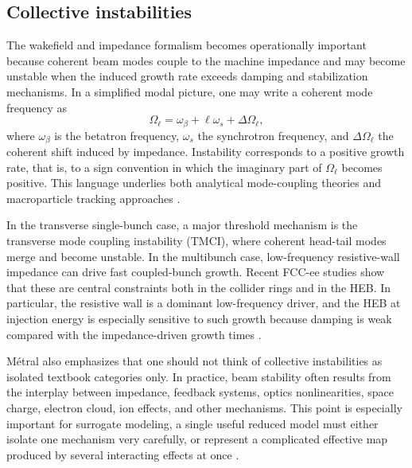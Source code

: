 \documentclass[11pt,a4paper]{article}
\begin{document}
\begin{sloppypar}
\subsection{Collective instabilities}

The wakefield and impedance formalism becomes operationally important because coherent beam modes couple to the machine impedance and may become unstable when the induced growth rate exceeds damping and stabilization mechanisms. In a simplified modal picture, one may write a coherent mode frequency as
\begin{equation}
\Omega_\ell
=
\omega_\beta+\ell\omega_s+\Delta\Omega_\ell,
\end{equation}
where $\omega_\beta$ is the betatron frequency, $\omega_s$ the synchrotron frequency, and $\Delta\Omega_\ell$ the coherent shift induced by impedance. Instability corresponds to a positive growth rate, that is, to a sign convention in which the imaginary part of $\Omega_\ell$ becomes positive. This language underlies both analytical mode-coupling theories and macroparticle tracking approaches \cite{metral_wake_2021-1}.

In the transverse single-bunch case, a major threshold mechanism is the transverse mode coupling instability (TMCI), where coherent head-tail modes merge and become unstable. In the multibunch case, low-frequency resistive-wall impedance can drive fast coupled-bunch growth. Recent FCC-ee studies show that these are central constraints both in the collider rings and in the HEB. In particular, the resistive wall is a dominant low-frequency driver, and the HEB at injection energy is especially sensitive to such growth because damping is weak compared with the impedance-driven growth times \cite{ghribi_impact_nodate,gibellieri_impact_nodate}.

Métral also emphasizes that one should not think of collective instabilities as isolated textbook categories only. In practice, beam stability often results from the interplay between impedance, feedback systems, optics nonlinearities, space charge, electron cloud, ion effects, and other mechanisms. This point is especially important for surrogate modeling, a single useful reduced model must either isolate one mechanism very carefully, or represent a complicated effective map produced by several interacting effects at once \cite{metral_wake_2021-1}.



\end{sloppypar}
\end{document}
